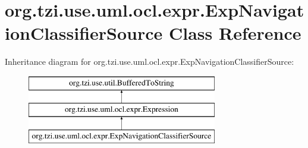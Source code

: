 \hypertarget{classorg_1_1tzi_1_1use_1_1uml_1_1ocl_1_1expr_1_1_exp_navigation_classifier_source}{\section{org.\-tzi.\-use.\-uml.\-ocl.\-expr.\-Exp\-Navigation\-Classifier\-Source Class Reference}
\label{classorg_1_1tzi_1_1use_1_1uml_1_1ocl_1_1expr_1_1_exp_navigation_classifier_source}
}
Inheritance diagram for org.\-tzi.\-use.\-uml.\-ocl.\-expr.\-Exp\-Navigation\-Classifier\-Source\-:\begin{figure}[H]
\begin{center}
\leavevmode
\includegraphics[height=3.000000cm]{classorg_1_1tzi_1_1use_1_1uml_1_1ocl_1_1expr_1_1_exp_navigation_classifier_source}
\end{center}
\end{figure}

